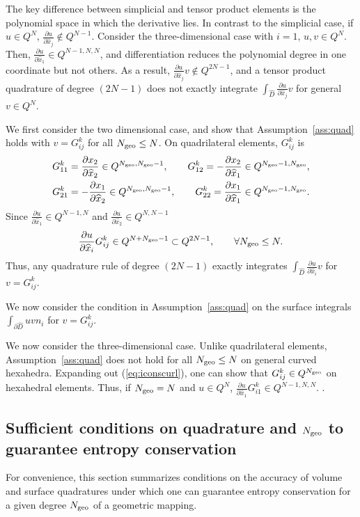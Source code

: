\documentclass[review]{siamart0216}
\theoremstyle{assumption}
\renewcommand{\hat}[1]{\hat{#1}}
\newcommand{\pd}[2]{\frac{\partial#1}{\partial#2}}
\renewcommand{\hat}{\widehat}
\newcommand{\note}[1]{{\color{blue}{#1}}}
\begin{document}
The key difference between simplicial and tensor product elements is the polynomial space in which the derivative lies.  In contrast to the simplicial case, if $u \in Q^N$, $\pd{u}{\hat{x}_j} \not\in Q^{N-1}$.  Consider the three-dimensional case with $i = 1$, $u, v \in Q^N$.  Then, $\pd{u}{\hat{x}_1} \in Q^{N-1,N,N}$, and differentiation reduces the polynomial degree in one coordinate but not others.  As a result, $\pd{u}{\hat{x}_j}v \not\in Q^{2N-1}$, and a tensor product quadrature of degree $(2N-1)$ does not exactly integrate $\int_{\hat{D}} \pd{u}{\hat{x}_j}v$ for general $v\in Q^N$.  

We first consider the two dimensional case, and show that Assumption~\ref{ass:quad} holds with $v = G^k_{ij}$ for all $N_{\rm geo} \leq N$.  On quadrilateral elements, $G^k_{ij}$ is
\begin{align*}
G^k_{11} &= \pd{x_2}{\hat{x}_2} \in Q^{N_{\rm geo}, N_{\rm geo}-1}, \qquad G^k_{12} = -\pd{x_2}{\hat{x}_1} \in Q^{N_{\rm geo}-1, N_{\rm geo}},\\
G^k_{21} &= -\pd{x_1}{\hat{x}_2} \in Q^{N_{\rm geo}, N_{\rm geo}-1}, \qquad G^k_{22} = \pd{x_1}{\hat{x}_1}\in Q^{N_{\rm geo}-1, N_{\rm geo}}.
\end{align*}
Since $\pd{u}{\hat{x}_1} \in Q^{N-1,N}$ and $\pd{u}{\hat{x}_2} \in Q^{N,N-1}$
\[
\pd{u}{\hat{x}_i}G^k_{ij} \in Q^{N+N_{\rm geo}-1} \subset Q^{2N-1}, \qquad \forall N_{\rm geo}\leq N.
\]
Thus, any quadrature rule of degree $(2N-1)$ exactly integrates $\int_{\hat{D}}\pd{u}{\hat{x}_i}v$ for $v = G^k_{ij}$.  

We now consider the condition in Assumption~\ref{ass:quad} on the surface integrals $\int_{\partial \hat{D}} u v n_i$ for $v= G^k_{ij}$.  \note{Finish}

We now consider the three-dimensional case.  Unlike quadrilateral elements, Assumption~\ref{ass:quad} does not hold for all $N_{\rm geo} \leq N$ on general curved hexahedra.  Expanding out (\ref{eq:iconscurl}), one can show that $G^k_{ij} \in Q^{N_{\rm geo}}$ on hexahedral elements.  Thus, if $N_{\rm geo} = N$ and $u\in Q^N$, $\pd{u}{\hat{x}_1} G^k_{i1} \in Q^{N-1,N,N}$.  \note{Finish}.  

\subsection{Sufficient conditions on quadrature and $N_{\rm geo}$ to guarantee entropy conservation}

For convenience, this section summarizes conditions on the accuracy of volume and surface quadratures under which one can guarantee entropy conservation for a given degree $N_{\rm geo}$ of a geometric mapping.
\end{document}
